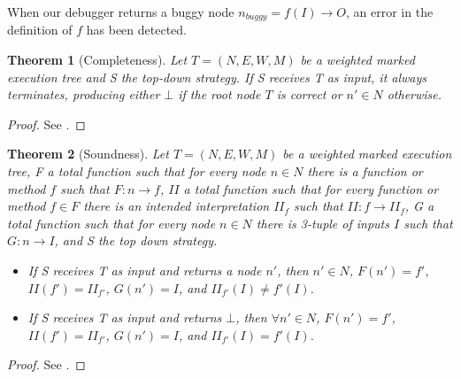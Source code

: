 \begin{definition}
When our debugger returns a buggy node \(n_{buggy} = f(I) \to O\), an error in the definition of \(f\) has been detected. 

\end{definition}
\newtheorem{theorem}{Theorem}
\begin{theorem}[Completeness]
Let \(T = (N,E,W,M)\) be a weighted marked execution tree and S the top-down strategy.
If S receives T as input, it always terminates, producing either \(\bot\) if the root node \(T\) is correct  or \(n'\in N\) otherwise.
\end{theorem}
\begin{proof}
See \cite{DeclarativeErrorDiagnosis}.
\end{proof}
\begin{theorem}[Soundness]
Let \(T = (N,E,W,M)\) be a weighted marked execution tree, F a total function such that for every node \(n\in N\) there is a function or method \(f\) such that \(F:n\to f\), \(\mathit{II}\) a total function such that for every function or method \(f\in F\) there is an intended interpretation \(\mathit{II}_f\) such that \(\mathit{II}:f\to \mathit{II}_f\), G a total function such that for every node \(n\in N\) there is 3-tuple of inputs \(I\) such that \(G:n\to I\), and S the top down strategy.
\begin{itemize}
    \item If S receives T as input and returns a node \(n'\), then \(n'\in N\), \(F(n') = f'\), \(\mathit{II}(f') = II_{f'}\), \(G(n') = I\), and \(II_{f'}(I)\neq f'(I)\).
    \item If S receives T as input and returns \(\bot\), then \(\forall n'\in N\), \(F(n') = f'\), \(\mathit{II}(f') = II_{f'}\), \(G(n') = I\), and \(II_{f'}(I) = f'(I)\).
\end{itemize}
\end{theorem}
\begin{proof}
See \cite{DeclarativeErrorDiagnosis}.
\end{proof}

